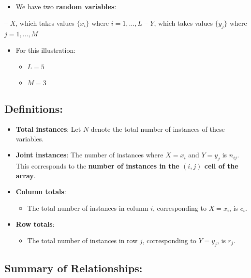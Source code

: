 \documentclass[
  12 pt,
  a4paper,
]{book}
\providecommand{\tightlist}{%
  \setlength{\itemsep}{0pt}\setlength{\parskip}{0pt}}
\numberwithin{equation}{section}
\theoremstyle{plain}      %
\theoremstyle{definition} %
\theoremstyle{remark}     %
\theoremstyle{note}         %
\begin{document}
\begin{itemize}
\tightlist
\item
  We have two \textbf{random variables}:
\end{itemize}

-- \(X\), which takes values \(\{x_i\}\) where \(i = 1, \ldots, L\) --
\(Y\), which takes values \(\{y_j\}\) where \(j = 1, \ldots, M\)

\begin{itemize}
\tightlist
\item
  For this illustration:

  \begin{itemize}
  \tightlist
  \item
    \(L = 5\)
  \item
    \(M = 3\)
  \end{itemize}
\end{itemize}

\hypertarget{definitions}{%
\subsection{Definitions:}\label{definitions}}

\begin{itemize}
\tightlist
\item
  \textbf{Total instances}: Let \(N\) denote the total number of
  instances of these variables.
\item
  \textbf{Joint instances}: The number of instances where \(X = x_i\)
  and \(Y = y_j\) is \(n_{ij}\). This corresponds to the \textbf{number
  of instances in the \((i, j)\) cell of the array}.
\item
  \textbf{Column totals}:

  \begin{itemize}
  \tightlist
  \item
    The total number of instances in column \(i\), corresponding to
    \(X = x_i\), is \(c_i\).
  \end{itemize}
\item
  \textbf{Row totals}:

  \begin{itemize}
  \tightlist
  \item
    The total number of instances in row \(j\), corresponding to
    \(Y = y_j\), is \(r_j\).
  \end{itemize}
\end{itemize}

\hypertarget{summary-of-relationships}{%
\subsection{Summary of Relationships:}\label{summary-of-relationships}}
\end{document}
